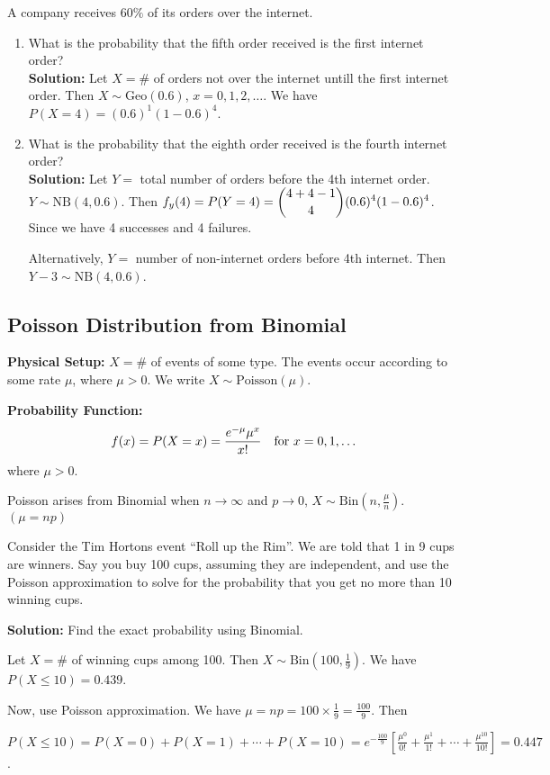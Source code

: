\begin{example}
    A company receives $60\%$ of its orders over the internet.
    \begin{enumerate}[label=(\alph*)]
        \item What is the probability that the fifth order received is the first internet order? \\
        \textbf{Solution:} Let $X = \#$ of orders not over the internet untill the first internet order. Then $X \sim \text{Geo}(0.6)$, $x=0,1,2,\ldots$.
        We have $P(X = 4) = (0.6)^1 (1-0.6)^4$.
        \item What is the probability that the eighth order received is the fourth internet order? \\
        \textbf{Solution:} Let $Y =$ total number of orders before the 4th internet order. $Y \sim \text{NB}(4, 0.6)$. Then $\displaystyle f_y(4) = P(Y = 4) = \binom{4+4-1}{4}(0.6)^4(1-0.6)^4$. Since we have 4 successes and 4 failures.
        
        Alternatively, $Y =$ number of non-internet orders before 4th internet. Then $Y-3 \sim \text{NB}(4,0.6)$.
    \end{enumerate}
\end{example}


\subsection{Poisson Distribution from Binomial}

\textbf{Physical Setup:} $X = \#$ of events of some type. The events occur according to some rate $\mu$, where $\mu > 0$.
We write $X \sim \text{Poisson}(\mu)$.

\textbf{Probability Function:} 
\[
    f(x) = P(X = x) = \displaystyle \frac{e^{-\mu} \mu^x}{x!} \quad \text{for } x = 0, 1, \ldots
\]
where $\mu > 0$.

\begin{remark}
    Poisson arises from Binomial when $n \to \infty$ and $p \to 0$, $X \sim \text{Bin}(n, \frac{\mu}{n})$. $(\mu = np)$
\end{remark}


\begin{example}
    Consider the Tim Hortons event ``Roll up the Rim''. We are told that 1 in 9 cups are winners.
    Say you buy 100 cups, assuming they are independent, and use the Poisson approximation to solve for the probability that you get no more than 10 winning cups.

    \textbf{Solution:} Find the exact probability using Binomial.

    Let $X = \#$ of winning cups among 100. Then $X \sim \text{Bin}(100, \frac{1}{9})$. We have $P(X \leq 10) = 0.439$.

    Now, use Poisson approximation. We have $\mu = np = 100 \times \frac{1}{9} = \frac{100}{9}$. Then

    $P(X \leq 10) = P(X = 0) + P(X = 1) + \cdots + P(X = 10) = e^{-\frac{100}{9}}\left[ \frac{\mu^0}{0!} + \frac{\mu^1}{1!} + \cdots + \frac{\mu^{10}}{10!}\right] = 0.447$. \\
\end{example}

